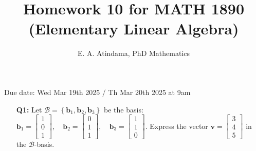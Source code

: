 \documentclass[a4paper,11pt,reqno]{amsart}
\title[MATH 1890 (Elementary Linear Algebra)]{Homework 10 for MATH 1890 (Elementary Linear Algebra)}
\author[Emmanuel Atindama]{E. A. Atindama, PhD Mathematics}
\numberwithin{equation}{section}
\begin{document}
\maketitle
Due date: Wed Mar 19th 2025 / Th Mar 20th 2025 at 9am
\vspace{0.5cm}

\begin{enumerate}
    \item[\textbf{Q1:}] 
    Let \( {\mathcal{B}} = \left\{ \mathbf{b}_1, \mathbf{b}_2, \mathbf{b}_3 \right\} \) be the basis: 
    \(
    \mathbf{b}_1 = \begin{bmatrix} 1 \\ 0 \\ 1 \end{bmatrix}, \quad
    \mathbf{b}_2 = \begin{bmatrix} 0 \\ 1 \\ 1 \end{bmatrix}, \quad
    \mathbf{b}_3 = \begin{bmatrix} 1 \\ 1 \\ 0 \end{bmatrix}.
    \)
    Express the vector \( \mathbf{v} = \begin{bmatrix} 3 \\ 4 \\ 5 \end{bmatrix} \) in the \( {\mathcal{B}} \)-basis.
    
    \begin{center}\setlength{\fboxsep}{10pt}
\end{center}
\end{enumerate}
\end{document}
